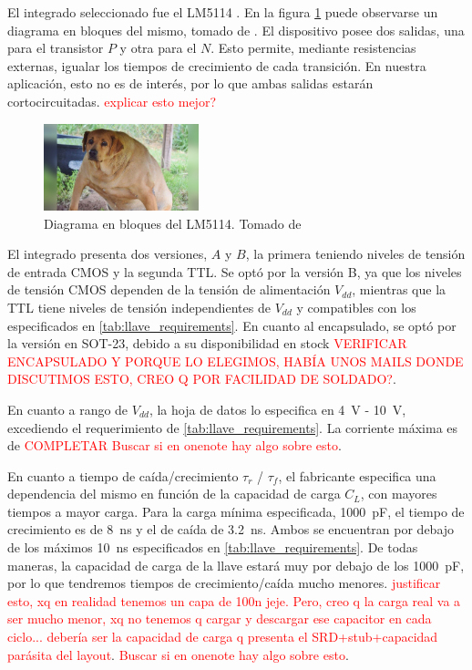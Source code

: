 El integrado seleccionado fue el LM5114 \cite{LM5114_datasheet}. En la figura
\ref{fig:lm5114_block_diagram} puede observarse un diagrama en bloques del
mismo, tomado de \cite{LM5114_datasheet}. El dispositivo posee dos salidas, una
para el transistor $P$ y otra para el $N$. Esto permite, mediante resistencias
externas, igualar los tiempos de crecimiento de cada transición. En nuestra
aplicación, esto no es de interés, por  lo que ambas salidas estarán
cortocircuitadas. \textcolor{red}{explicar esto mejor?}

\begin{figure}[tbp]
    \centering
    \includegraphics[width=0.4\textwidth]{images/placeholder.jpg}
    \caption{Diagrama en bloques del LM5114. Tomado de \cite{LM5114_datasheet}}
    \label{fig:lm5114_block_diagram}
\end{figure}

El integrado presenta dos versiones, $A$ y $B$, la primera teniendo niveles de
tensión de entrada CMOS y la segunda TTL.  Se optó por la versión B, ya que los
niveles de tensión CMOS dependen de la tensión de alimentación $V_{dd}$,
mientras que la TTL tiene niveles de tensión independientes de $V_{dd}$ y
compatibles con los especificados en \ref{tab:llave_requirements}. En cuanto al
encapsulado, se optó por la versión en SOT-23, debido a su disponibilidad en
stock \textcolor{red}{VERIFICAR ENCAPSULADO Y PORQUE LO ELEGIMOS, HABÍA UNOS
MAILS DONDE DISCUTIMOS ESTO, CREO Q POR FACILIDAD DE SOLDADO?}.

En cuanto a rango de $V_{dd}$, la hoja de datos lo especifica en \qty{4}{\volt}
- \qty{10}{\volt}, excediendo el requerimiento de \ref{tab:llave_requirements}.
La corriente máxima es de \textcolor{red}{COMPLETAR} \textcolor{red}{Buscar si
en onenote hay algo sobre esto}.

En cuanto a tiempo de caída/crecimiento $\tau_{r}$ / $\tau_{f}$, el fabricante
especifica una dependencia del mismo en función de la capacidad de carga $C_L$,
con mayores tiempos a mayor carga. Para la carga mínima especificada,
\qty{1000}{\pico\farad}, el tiempo de crecimiento es de \qty{8}{\nano\second} y
el de caída de \qty{3.2}{\nano\second}. Ambos se encuentran por debajo de los
máximos \qty{10}{\nano\second} especificados en \ref{tab:llave_requirements}. De
todas maneras, la capacidad de carga de la llave estará muy por debajo de los
\qty{1000}{\pico\farad}, por lo que tendremos tiempos de crecimiento/caída mucho
menores. \textcolor{red}{justificar esto, xq en realidad tenemos un capa de 100n
jeje. Pero, creo q la carga real va a ser mucho menor, xq no tenemos q cargar y
descargar ese capacitor en cada ciclo...  debería ser la capacidad de carga q
presenta el SRD+stub+capacidad parásita del layout}.  \textcolor{red}{Buscar si
en onenote hay algo sobre esto}.

